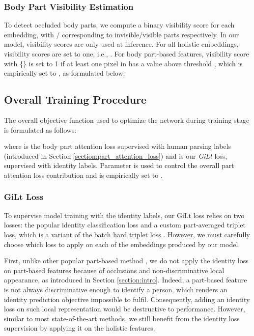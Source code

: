 \documentclass[10pt,twocolumn,letterpaper]{article}
\begin{document}
\subsubsection{Body Part Visibility Estimation} \label{section:visibility}
To detect occluded body parts, we compute a binary visibility score  for each embedding, with / corresponding to invisible/visible parts respectively.
In our {\model} model, visibility scores are only used at inference.
For all holistic embeddings, visibility scores are set to one, i.e., .
For body part-based features, visibility score  with   \{\} is set to 1 if at least one pixel in  has a value above threshold , which is empirically set to , as formulated below:
{\small{

}}



















\subsection{Overall Training Procedure} \label{section:training}
The overall objective function used to optimize the network during training stage is formulated as follows:
{\small{

}}
where  is the body part attention loss supervised with human parsing labels (introduced in Section \ref{section:part_attention_loss}) and  is our \textit{GiLt} loss, supervised with identity labels. 
Parameter  is used to control the overall part attention loss contribution and is empirically set to .


\subsubsection{GiLt Loss} \label{section:gilt}
To supervise model training with the identity labels, our GiLt loss relies on two losses: the popular identity classification loss and a custom part-averaged triplet loss, which is a variant of the batch hard triplet loss \cite{triplet}.
However, we must carefully choose which loss to apply on each of the  embeddings produced by our model.

First, unlike other popular part-based method \cite{PCB, PGFA, HOReID, PVPM, VGTri, PAT, DAReID, AAformer}, we do not apply the identity loss on part-based features because of occlusions and non-discriminative local appearance, as introduced in Section \ref{section:intro}.
Indeed, a part-based feature is not always discriminative enough to identify a person, which renders an identity prediction objective impossible to fulfil.
Consequently, adding an identity loss on such local representation would be destructive to performance.
However, similar to most state-of-the-art {\reid} methods, we still benefit from the identity loss supervision by applying it on the holistic features.
\end{document}
